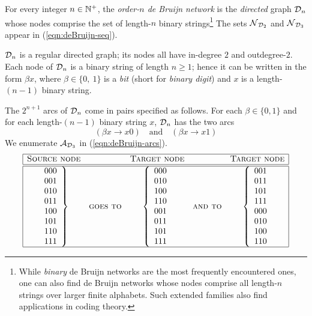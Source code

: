 For every integer $n \in \mathbb{N}^+$, the {\it order-$n$ de Bruijn network}
is the {\em directed} graph $\mbox{$\cal D$}_n$ whose nodes comprise the set of
length-$n$ binary strings\footnote{While {\em binary} de Bruijn
  networks are the most frequently encountered ones, one can also find
  de Bruijn networks whose nodes comprise all length-$n$ strings over
  larger finite alphabets.  Such extended families also find
  applications in coding theory.}  The sets $\mbox{$\cal N$}_{\mbox{{\scriptsize $\cal D$}}_2}$ and
$\mbox{$\cal N$}_{\mbox{{\scriptsize $\cal D$}}_3}$ appear in (\ref{eqn:deBruijn-seq}).

$\mbox{$\cal D$}_n$ is a regular directed graph; its nodes all have in-degree $2$
and outdegree-$2$.  Each node of $\mbox{$\cal D$}_n$ is a binary string of
length $n \geq 1$; hence it can be written in the form $\beta x$,
where $\beta \in \{0, \ 1\}$ is a {\it bit} (short for {\it binary
  digit}) and $x$ is a length-$(n-1)$ binary string.

The $2^{n+1}$ arcs of $\mbox{$\cal D$}_n$ come in pairs specified as follows.  For
each $\beta \in \{0,1\}$ and for each length-$(n-1)$ binary string
$x$, $\mbox{$\cal D$}_n$ has the two arcs
\[ (\beta x \rightarrow x0) \ \ \ \mbox{ and } \ \ \ 
(\beta x \rightarrow x1)
\]
We enumerate $\mbox{$\cal A$}_{\mbox{{\scriptsize $\cal D$}}_3}$ in (\ref{eqn:deBruijn-arcs}).
\begin{equation}
\label{eqn:deBruijn-arcs}
\begin{array}{|ccccc|}
\hline
\mbox{\sc Source node} & & \mbox{\sc Target node} & & \mbox{\sc Target node} \\
\hline \hline
{\displaystyle
\left.
\begin{array}{c}
000 \\
001 \\
010 \\
011 \\
100 \\
101 \\
110 \\
111
\end{array}
\right\}
} &
\mbox{\sc goes to} 
  &
{\displaystyle
\left\{
\begin{array}{c}
000 \\
010 \\
100 \\
110 \\
001 \\
011 \\
101 \\
111
\end{array}
\right.
}
  &
\mbox{\sc and to}
  &
{\displaystyle
\left\{
\begin{array}{c}
001 \\
011 \\
101 \\
111 \\
000 \\
010 \\
100 \\
110
\end{array} 
\right.
}
 \\
\hline
\end{array}
\end{equation}

